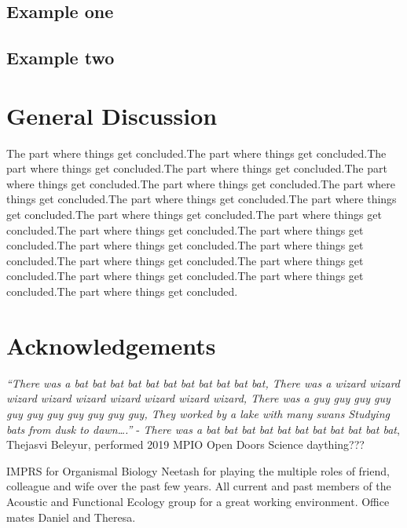 \documentclass[
]{book}
\begin{document}
\hypertarget{example-one}{%
\section{Example one}\label{example-one}}

\hypertarget{example-two}{%
\section{Example two}\label{example-two}}

\hypertarget{general-discussion}{%
\chapter{General Discussion}\label{general-discussion}}

The part where things get concluded.The part where things get concluded.The part where things get concluded.The part where things get concluded.The part where things get concluded.The part where things get concluded.The part where things get concluded.The part where things get concluded.The part where things get concluded.The part where things get concluded.The part where things get concluded.The part where things get concluded.The part where things get concluded.The part where things get concluded.The part where things get concluded.The part where things get concluded.The part where things get concluded.The part where things get concluded.The part where things get concluded.The part where things get concluded.

\hypertarget{acknowledgements}{%
\chapter{Acknowledgements}\label{acknowledgements}}

\emph{``There was a bat bat bat bat bat bat bat bat bat bat bat,
\newline
There was a wizard wizard wizard wizard wizard wizard wizard wizard wizard,
\newline 
There was a guy guy guy guy guy guy guy guy guy guy guy,
\newline
They worked by a lake with many swans
\newline
Studying bats from dusk to dawn\ldots.''}
- \emph{There was a bat bat bat bat bat bat bat bat bat bat bat}, Thejasvi Beleyur, performed 2019 MPIO Open Doors Science daything???

IMPRS for Organismal Biology
Neetash for playing the multiple roles of friend, colleague and wife over the past few years.
All current and past members of the Acoustic and Functional Ecology group for a great working environment. Office mates Daniel and Theresa.
\end{document}

